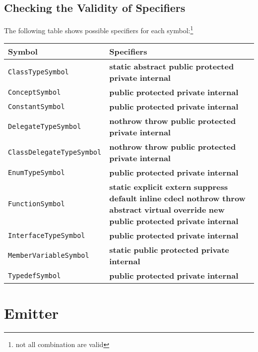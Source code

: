 \documentclass[a4paper,oneside,11pt]{book}
\theoremstyle{definition}
\begin{document}
\section{Checking the Validity of Specifiers}

The following table shows possible specifiers for each symbol:\footnote{not all combination are valid}

\begin{flushleft}
\begin{supertabular}{lp{10cm}}
\textbf{Symbol}& \textbf{Specifiers}\\
\hline
\verb|ClassTypeSymbol|& \textbf{static} \textbf{abstract} \textbf{public} \textbf{protected} \textbf{private} \textbf{internal}\\
\verb|ConceptSymbol|& \textbf{public} \textbf{protected} \textbf{private} \textbf{internal}\\
\verb|ConstantSymbol|& \textbf{public} \textbf{protected} \textbf{private} \textbf{internal}\\
\verb|DelegateTypeSymbol|& \textbf{nothrow} \textbf{throw} \textbf{public} \textbf{protected} \textbf{private} \textbf{internal}\\
\verb|ClassDelegateTypeSymbol|& \textbf{nothrow} \textbf{throw} \textbf{public} \textbf{protected} \textbf{private} \textbf{internal}\\
\verb|EnumTypeSymbol|& \textbf{public} \textbf{protected} \textbf{private} \textbf{internal}\\
\verb|FunctionSymbol|&
\textbf{static} \textbf{explicit} \textbf{extern} \textbf{suppress} \textbf{default} \textbf{inline} \textbf{cdecl} \textbf{nothrow} \textbf{throw}
\textbf{abstract} \textbf{virtual} \textbf{override} \textbf{new}
\textbf{public} \textbf{protected} \textbf{private} \textbf{internal}\\
\verb|InterfaceTypeSymbol|& \textbf{public} \textbf{protected} \textbf{private} \textbf{internal}\\
\verb|MemberVariableSymbol|& \textbf{static} \textbf{public} \textbf{protected} \textbf{private} \textbf{internal}\\
\verb|TypedefSymbol|& \textbf{public} \textbf{protected} \textbf{private} \textbf{internal}\\
\hline
\end{supertabular}
\end{flushleft}



\chapter{Emitter}
\end{document}
